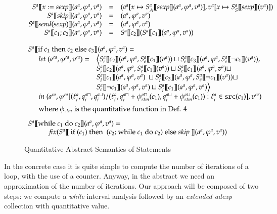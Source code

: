 \documentclass{llncs}
\newcommand{\blangle}{\big\langle}
\newcommand{\brangle}{\big\rangle}
\begin{document}
\begin{figure}[H]
{\small \[
\begin{array}{rcl}
S^a[\![x := sexp ]\!](a^a, \varphi^a, v^a) & = & (a^a[x \mapsto S_A^a [\![sexp ]\!](a^a, \varphi^a, v^a)], v^a[x \mapsto S_S^a [\![sexp ]\!](v^a)]) \\
S^a[\![skip]\!](a^a, \varphi^a, v^a) & = & (a^a, \varphi^a, v^a) \\
S^a[\![send(sexp)]\!](a^a, \varphi^a, v^a) & = & (a^a, \varphi^a, v^a) \\
S^a[\![c_1 ; c_2 ]\!](a^a, \varphi^a, v^a) & = &  S^a[\![c_2 ]\!](S^a[\![c_1 ]\!](a^a, \varphi^a, v^a) ) \\ 
\end{array}\\
\]}

{\small \[
\begin{array}{ll}
\multicolumn{2}{l}{S^a [\![\mbox{if } c_1 \mbox{ then } c_2  \mbox{ else }c_3 ]\!](a^a, \varphi^a, v^a) = }\\ %
& \begin{array}{ll}
\textit{let }(a'^a, \varphi'^a, v'^a)  = & 
\blangle  S_e^a [\![c_2 ]\!](a^a, \varphi^a, S_e^a[\![c_1 ]\!](v^a)) \sqcup S_e^a [\![c_3 ]\!](a^a,\varphi^a, S_e^a[\![\neg c_1 ]\!](v^a))  , \\ 
& S_i^a [\![c_2 ]\!](a^a, \varphi^a, S_e^a[\![c_1 ]\!](v^a)) \sqcup S_e^a [\![c_1 ]\!](a^a, \varphi^a, v^a) \sqcup \\  
& S_i^a [\![c_1 ]\!](a^a, \varphi^a, v^a)\ \sqcup S_i^a [\![c_3 ]\!](a^a, \varphi^a, S_e^a[\![\neg c_1 ]\!](v^a)) \sqcup\\
& S_e^a [\![\neg c_1 ]\!](a^a, \varphi^a, v^a) \sqcup  S_i^a [\![c_1 ]\!](a^a, \varphi^a, v^a) 
\brangle\\%
\multicolumn{2}{l}{\textit{in } (a'^a, \varphi'^a[(\ell_i^a, q_i^{a\sqcap}, q_i^{a\sqcup})/(\ell_i^a, q_i^{a\sqcap}+\phi_{stm}^{a\sqcap}(c_1), q_i^{a\sqcup}+\phi_{stm}^{a\sqcup}(c_1)): \ell_i^a \in \texttt{src}(c_1)], v'^a) }\\[0.2cm]
\multicolumn{2}{l}{\text{where } \phi_{stm} \text{ is the quantitative function in Def. 4} }\\[0.3cm]
\end{array}\\[0.8cm]
\multicolumn{2}{l}{S^a[\![\mbox{while } c_1 \mbox{ do } c_2]\!](a^a, \varphi^a, v^a)  = }\\%
& \qquad \textit{fix}(S^a [\![\mbox{ if } (c_1) \mbox{ then } \mbox{ (}c_2\mbox{; while } c_1 \mbox{ do } c_2 ) \mbox{ else \textit{skip} }]\!](a^a, \varphi^a, v^a))\\
\end{array}
\]}
\caption{Quantitative Abstract Semantics of  Statements}
\label{quant_abs_sem_cstm}
\end{figure}
In the concrete case it is quite simple to compute the number of iterations of a loop, with the use of a counter. Anyway, in the abstract we need an approximation of the number of iterations. Our approach will be composed of two steps:  we compute a {\em while} interval analysis
followed by an {\em extended adexp} collection with quantitative value.
\end{document}
